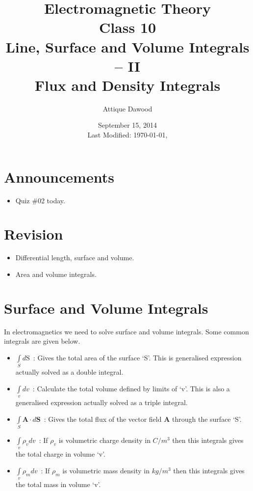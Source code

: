 \documentclass[12pt,a4paper]{article}
\title{Electromagnetic Theory\\Class 10\\Line, Surface and Volume Integrals -- II\\Flux and Density Integrals}
\author{Attique Dawood}
\date{September 15, 2014\\[0.2cm] Last Modified: \today, \currenttime}
\begin{document}
\maketitle
\section{Announcements}
\begin{itemize}
\item Quiz \#02 today.
\end{itemize}
\section{Revision}
\begin{itemize}
\item Differential length, surface and volume.
\item Area and volume integrals.
\end{itemize}
\section{Surface and Volume Integrals}
In electromagnetics we need to solve surface and volume integrals. Some common integrals are given below.
\begin{itemize}
\item $\int\limits_{S} d\mathrm{S}$~: Gives the total area of the surface `S'. This is generalised expression actually solved as a double integral.
\item $\int\limits_{v} dv$~: Calculate the total volume defined by limits of `v'. This is also a generalised expression actually solved as a triple integral.
\item $\int\limits_{S}\textbf{A}\cdot d\textbf{S}$~: Gives the total flux of the vector field \textbf{A} through the surface `S'.
\item $\int\limits_{v}\rho_v dv$~: If $\rho_v$ is volumetric charge density in $C/m^3$ then this integrals gives the total charge in volume `v'.
\item $\int\limits_{v}\rho_m dv$~: If $\rho_m$ is volumetric mass density in $kg/m^3$ then this integrals gives the total mass in volume `v'.
\end{itemize}
\end{document}
